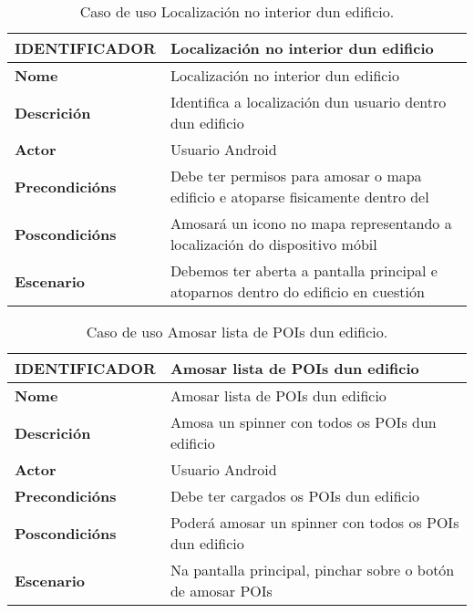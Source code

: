 \begin{table}[tbh]
	\begin{tabular}{|l|p{10cm}|}
		\hline 
		\textbf{IDENTIFICADOR}	& \textbf{Localización no interior dun edificio} \\ 
		\hline 
		\textbf{Nome} & Localización no interior dun edificio \\ 
		\hline 
		\textbf{Descrición} & Identifica a localización dun usuario dentro dun edificio \\ 
		\hline 
		\textbf{Actor} & Usuario Android \\ 
		\hline 
		\textbf{Precondicións} & Debe ter permisos para amosar o mapa edificio e atoparse fisicamente dentro del \\ 
		\hline 
		\textbf{Poscondicións} & Amosará un icono no mapa representando a localización do dispositivo móbil \\ 
		\hline 
		\textbf{Escenario} & Debemos ter aberta a pantalla principal e atoparnos dentro do edificio en cuestión \\ 
		\hline 
	\end{tabular}
	\caption{Caso de uso Localización no interior dun edificio.}
	\label{tab:cuLocalizacion}
\end{table}

\begin{table}[tbh]
	\begin{tabular}{|l|p{10cm}|}
		\hline 
		\textbf{IDENTIFICADOR}	& \textbf{Amosar lista de POIs dun edificio} \\ 
		\hline 
		\textbf{Nome} & Amosar lista de POIs dun edificio \\ 
		\hline 
		\textbf{Descrición} & Amosa un spinner con todos os POIs dun edificio \\ 
		\hline 
		\textbf{Actor} & Usuario Android \\ 
		\hline 
		\textbf{Precondicións} & Debe ter cargados os POIs dun edificio \\ 
		\hline 
		\textbf{Poscondicións} & Poderá amosar un spinner con todos os POIs dun edificio \\ 
		\hline 
		\textbf{Escenario} & Na pantalla principal, pinchar sobre o botón de amosar POIs \\ 
		\hline 
	\end{tabular}
	\caption{Caso de uso Amosar lista de POIs dun edificio.}
	\label{tab:cuAmosarListaPOI}
\end{table}

